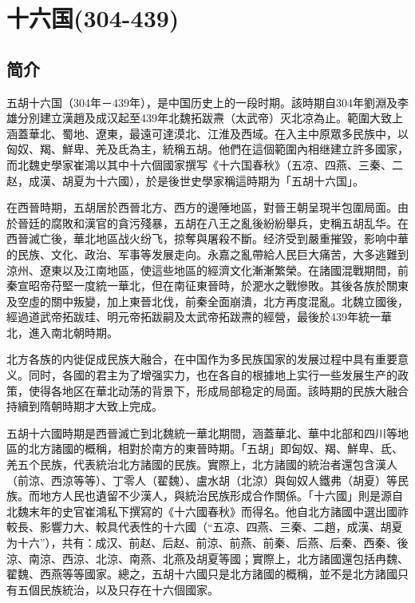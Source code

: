 
\chapter{十六国\tiny(304-439)}

\section{简介}

五胡十六国（304年－439年），是中国历史上的一段时期。該時期自304年劉淵及李雄分別建立漢趙及成汉起至439年北魏拓跋燾（太武帝）灭北凉為止。範圍大致上涵蓋華北、蜀地、遼東，最遠可達漠北、江淮及西域。在入主中原眾多民族中，以匈奴、羯、鮮卑、羌及氐為主，統稱五胡。他們在這個範圍內相继建立許多國家，而北魏史學家崔鴻以其中十六個國家撰写《十六国春秋》（五凉、四燕、三秦、二赵，成漢、胡夏为十六國），於是後世史學家稱這時期为「五胡十六国」。

在西晉時期，五胡居於西晉北方、西方的邊陲地區，對晉王朝呈現半包圍局面。由於晉廷的腐敗和漢官的貪污殘暴，五胡在八王之亂後紛紛舉兵，史稱五胡乱华。在西晉滅亡後，華北地區战火纷飞，掠奪與屠殺不斷。经济受到嚴重摧毀，影响中華的民族、文化、政治、军事等发展走向。永嘉之亂帶給人民巨大痛苦，大多逃難到涼州、遼東以及江南地區，使這些地區的經濟文化漸漸繁榮。在諸國混戰期間，前秦宣昭帝苻堅一度統一華北，但在南征東晉時，於淝水之戰慘敗。其後各族於關東及空虛的關中叛變，加上東晉北伐，前秦全面崩潰，北方再度混亂。北魏立國後，經過道武帝拓跋珪、明元帝拓跋嗣及太武帝拓跋燾的經營，最後於439年統一華北，進入南北朝時期。

北方各族的内徙促成民族大融合，在中国作为多民族国家的发展过程中具有重要意义。同时，各國的君主为了增强实力，也在各自的根據地上实行一些发展生产的政策，使得各地区在華北动荡的背景下，形成局部稳定的局面。該時期的民族大融合持續到隋朝時期才大致上完成。

五胡十六國時期是西晉滅亡到北魏統一華北期間，涵蓋華北、華中北部和四川等地區的北方諸國的概稱，相對於南方的東晉時期。「五胡」即匈奴、羯、鮮卑、氐、羌五个民族，代表統治北方諸國的民族。實際上，北方諸國的統治者還包含漢人（前涼、西涼等等）、丁零人（翟魏）、盧水胡（北涼）與匈奴人鐵弗（胡夏）等民族。而地方人民也遺留不少漢人，與統治民族形成合作關係。「十六國」則是源自北魏末年的史官崔鴻私下撰寫的《十六國春秋》而得名。他自北方諸國中選出國祚較長、影響力大、較具代表性的十六國（“五凉、四燕、三秦、二趙，成漢、胡夏为十六”），共有：成汉、前赵、后赵、前涼、前燕、前秦、后燕、后秦、西秦、後涼、南涼、西涼、北涼、南燕、北燕及胡夏等國；實際上，北方諸國還包括冉魏、翟魏、西燕等等國家。總之，五胡十六國只是北方諸國的概稱，並不是北方諸國只有五個民族統治，以及只存在十六個國家。

